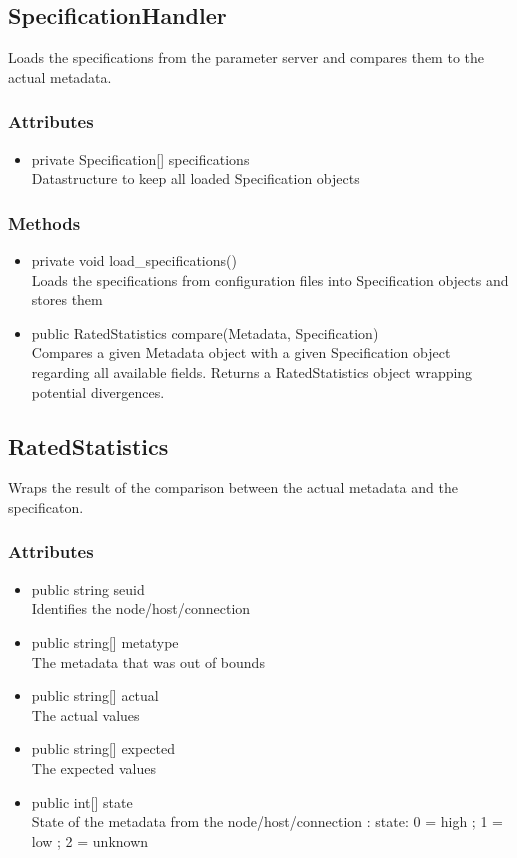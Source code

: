\subsection{SpecificationHandler}
Loads the specifications from the parameter server and compares them to the actual metadata.

\subsubsection{Attributes}
\begin{itemize}
	\item private Specification[] specifications\\
	Datastructure to keep all loaded Specification objects
\end{itemize}
\subsubsection{Methods}
\begin{itemize}
	\item private void load_specifications()\\
	Loads the specifications from configuration files into Specification objects and stores them
	\item public RatedStatistics compare(Metadata, Specification)\\
	Compares a given Metadata object with a given Specification object regarding all available fields. Returns a RatedStatistics object wrapping potential divergences.
\end{itemize}


\subsection{RatedStatistics}
Wraps the result of the comparison between the actual metadata and the specificaton.

\subsubsection{Attributes}
\begin{itemize}
	\item public string seuid\\
	Identifies the node/host/connection
	\item public string[] metatype\\
	The metadata that was out of bounds
	\item public string[] actual\\
	The actual values
	\item public string[] expected\\
	The expected values
	\item public int[] state\\
	State of the metadata from the node/host/connection : state: { 0 = high ; 1 = low ; 2 = unknown}
\end{itemize}


